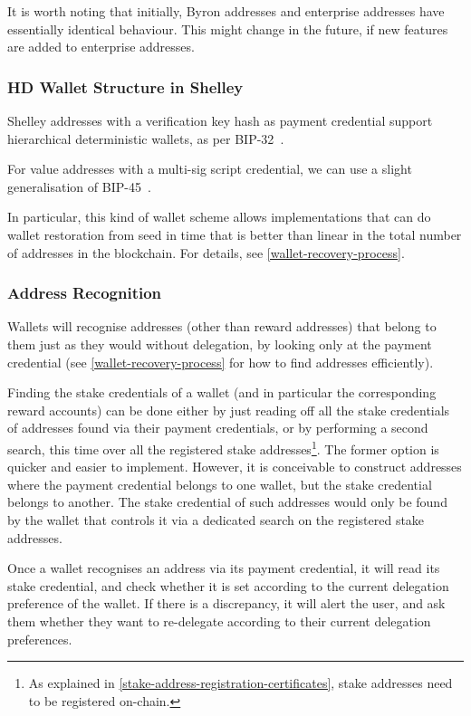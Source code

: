 \documentclass[11pt,a4paper,dvipsnames,twosided]{article}
\newcommand{\citep}[1]{\cite{#1}}
\begin{document}
It is worth noting that initially, Byron addresses and enterprise addresses
have essentially identical behaviour. This might change in the future, if new
features are added to enterprise addresses.

\subsubsection{HD Wallet Structure in Shelley}
\label{hd-wallet-structure-in-shelley}

Shelley addresses with a verification key hash as payment credential
support hierarchical deterministic wallets, as per BIP-32~\citep{bip32}.

For value addresses with a multi-sig script credential, we can use a slight
generalisation of BIP-45~\citep{bip45}.

In particular, this kind of wallet scheme allows implementations that can
do wallet restoration from seed in time that is better than linear in
the total number of addresses in the blockchain. For details, see
\cref{wallet-recovery-process}.

\subsubsection{Address Recognition}
\label{address-recognition-1}

Wallets will recognise addresses (other than reward addresses) that belong to
them just as they would without delegation, by looking only at the
payment credential (see \cref{wallet-recovery-process} for how to find
addresses efficiently).

Finding the stake credentials of a wallet (and in particular the corresponding
reward accounts) can be done either by just reading off all the stake credentials
of addresses found via their payment credentials, or by performing a second search,
this time over all the registered stake addresses\footnote{As explained in
  \cref{stake-address-registration-certificates}, stake addresses need to be
  registered on-chain.}. The former option is quicker and easier to implement.
However, it is conceivable to construct addresses where the payment credential
belongs to one wallet, but the stake credential belongs to another. The stake
credential of such addresses would only be found by the wallet that controls it via
a dedicated search on the registered stake addresses.

Once a wallet recognises an address via its payment credential, it will read its
stake credential, and check whether it is set according
to the current delegation preference of the wallet. If there is a
discrepancy, it will alert the user, and ask them whether they want to
re-delegate according to their current delegation preferences.
\end{document}

